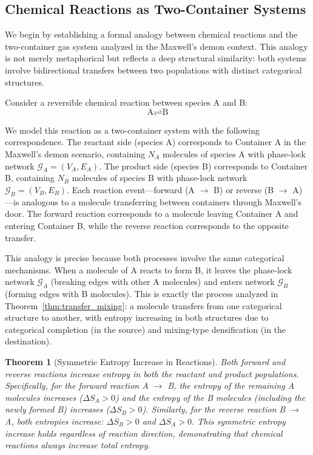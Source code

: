 \documentclass[12pt,a4paper]{article}
\newtheorem{theorem}{Theorem}[section]
\theoremstyle{definition}
\theoremstyle{remark}
\newcommand{\phaselockgraph}{\mathcal{G}}
\begin{document}
\subsection{Chemical Reactions as Two-Container Systems}

We begin by establishing a formal analogy between chemical reactions and the two-container gas system analyzed in the Maxwell's demon context. This analogy is not merely metaphorical but reflects a deep structural similarity: both systems involve bidirectional transfers between two populations with distinct categorical structures.

Consider a reversible chemical reaction between species A and B:
\begin{equation}
\text{A} \rightleftharpoons \text{B}
\label{eq:reversible_reaction}
\end{equation}

We model this reaction as a two-container system with the following correspondence. The reactant side (species A) corresponds to Container A in the Maxwell's demon scenario, containing $N_A$ molecules of species A with phase-lock network $\phaselockgraph_A = (V_A, E_A)$. The product side (species B) corresponds to Container B, containing $N_B$ molecules of species B with phase-lock network $\phaselockgraph_B = (V_B, E_B)$. Each reaction event—forward (A $\to$ B) or reverse (B $\to$ A)—is analogous to a molecule transferring between containers through Maxwell's door. The forward reaction corresponds to a molecule leaving Container A and entering Container B, while the reverse reaction corresponds to the opposite transfer.

This analogy is precise because both processes involve the same categorical mechanisms. When a molecule of A reacts to form B, it leaves the phase-lock network $\phaselockgraph_A$ (breaking edges with other A molecules) and enters network $\phaselockgraph_B$ (forming edges with B molecules). This is exactly the process analyzed in Theorem~\ref{thm:transfer_mixing}: a molecule transfers from one categorical structure to another, with entropy increasing in both structures due to categorical completion (in the source) and mixing-type densification (in the destination).

\begin{theorem}[Symmetric Entropy Increase in Reactions]
\label{thm:reaction_entropy}
Both forward and reverse reactions increase entropy in both the reactant and product populations. Specifically, for the forward reaction A $\to$ B, the entropy of the remaining A molecules increases ($\Delta S_A > 0$) and the entropy of the B molecules (including the newly formed B) increases ($\Delta S_B > 0$). Similarly, for the reverse reaction B $\to$ A, both entropies increase: $\Delta S_B > 0$ and $\Delta S_A > 0$. This symmetric entropy increase holds regardless of reaction direction, demonstrating that chemical reactions always increase total entropy.
\end{theorem}
\end{document}
